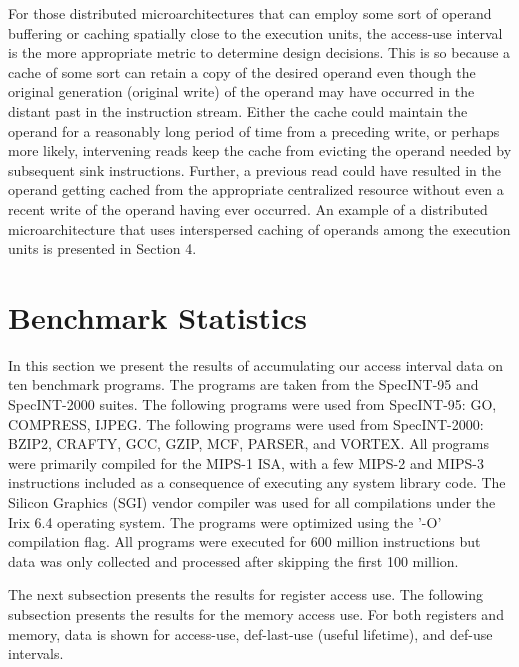 \documentclass[10pt,dvips]{article}
\begin{document}
For those distributed microarchitectures that can employ
some sort of operand buffering or caching spatially close to
the execution units, the access-use interval is the more appropriate
metric to determine design decisions.
This is so because a cache of some sort can retain a copy of the
desired operand even though the original generation (original write)
of the operand may have occurred in the distant past in the instruction stream.
Either the cache could maintain the operand for a reasonably long
period of time from a preceding write, or perhaps more likely, 
intervening reads keep
the cache from evicting the operand 
needed by subsequent sink instructions.
Further, a previous read could have resulted in the operand getting
cached from the appropriate centralized resource without even a recent 
write of the operand having ever occurred.
An example of a distributed microarchitecture that uses interspersed
caching of operands among the execution units is presented in Section 4.
%
\section{Benchmark Statistics}
%
In this section we present the results of accumulating our
access interval data on ten benchmark programs.
The programs are taken from the SpecINT-95 and SpecINT-2000
suites.
The following programs were used from SpecINT-95: GO, COMPRESS,
IJPEG.  
The following programs were used from SpecINT-2000:
BZIP2, CRAFTY, GCC, GZIP, MCF, PARSER, and VORTEX.
All programs were primarily compiled for the MIPS-1 ISA,
with a few MIPS-2 and MIPS-3 instructions included as a
consequence of executing any system library code.
The Silicon Graphics (SGI) vendor compiler was used for
all compilations under the Irix 6.4 operating system.
The programs were optimized using the '-O' compilation flag.
All programs were executed for 600 million instructions but
data was only collected and processed after skipping the
first 100 million.

The next subsection presents the results for register access use.
The following subsection presents the results for the memory 
access use.  For both registers and memory, data is shown for 
access-use, def-last-use (useful lifetime), and def-use
intervals.
%
%
\end{document}
